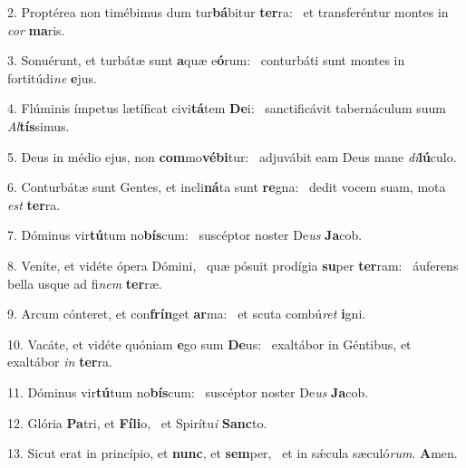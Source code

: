 2. Proptérea non timébimus dum tur\textbf{bá}bitur \textbf{ter}ra: \ast\  et transferéntur montes in \textit{cor} \textbf{ma}ris.\

3. Sonuérunt, et turbátæ sunt \textbf{a}quæ e\textbf{ó}rum: \ast\  conturbáti sunt montes in fortitúdi\textit{ne} \textbf{e}jus.\

4. Flúminis ímpetus lætíficat civi\textbf{tá}tem \textbf{De}i: \ast\  sanctificávit tabernáculum suum \textit{Al}\textbf{tís}simus.\

5. Deus in médio ejus, non \textbf{com}mo\textbf{vé}\textbf{bi}tur: \ast\  adjuvábit eam Deus mane \textit{di}\textbf{lú}culo.\

6. Conturbátæ sunt Gentes, et incli\textbf{ná}ta sunt \textbf{re}gna: \ast\  dedit vocem suam, mota \textit{est} \textbf{ter}ra.\

7. Dóminus vir\textbf{tú}tum no\textbf{bís}cum: \ast\  suscéptor noster De\textit{us} \textbf{Ja}cob.\

8. Veníte, et vidéte ópera Dómini, \dag\  quæ pósuit prodígia \textbf{su}per \textbf{ter}ram: \ast\  áuferens bella usque ad fi\textit{nem} \textbf{ter}ræ.\

9. Arcum cónteret, et con\textbf{frín}get \textbf{ar}ma: \ast\  et scuta combú\textit{ret} \textbf{i}gni.\

10. Vacáte, et vidéte quóniam \textbf{e}go sum \textbf{De}us: \ast\  exaltábor in Géntibus, et exaltábor \textit{in} \textbf{ter}ra.\

11. Dóminus vir\textbf{tú}tum no\textbf{bís}cum: \ast\  suscéptor noster De\textit{us} \textbf{Ja}cob.\

12. Glória \textbf{Pa}tri, et \textbf{Fí}\textbf{li}o, \ast\  et Spirítu\textit{i} \textbf{Sanc}to.\

13. Sicut erat in princípio, et \textbf{nunc}, et \textbf{sem}per, \ast\  et in sǽcula sæculó\textit{rum}. \textbf{A}men.\

